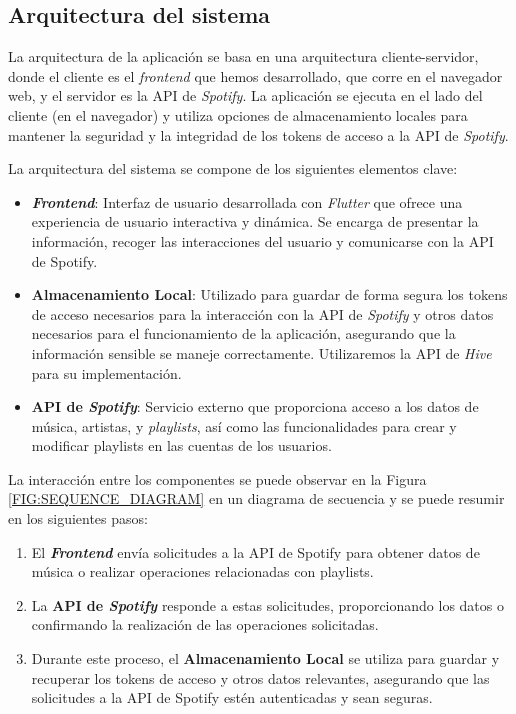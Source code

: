 \subsection{Arquitectura del sistema\label{SEC:DISENO_ARQUITECTURA}}

La arquitectura de la aplicación se basa en una arquitectura cliente-servidor, donde el cliente es el \textit{frontend} que hemos desarrollado, que corre en el navegador web, y 
el servidor es la API de \textit{Spotify}. La aplicación se ejecuta en el lado del cliente (en el navegador) y utiliza opciones de almacenamiento locales para mantener la seguridad y 
la integridad de los tokens de acceso a la API de \textit{Spotify}. 

La arquitectura del sistema se compone de los siguientes elementos clave:

\begin{itemize}
    \item \textbf{\textit{Frontend}}: Interfaz de usuario desarrollada con \textit{Flutter} que ofrece una experiencia de usuario interactiva 
    y dinámica. Se encarga de presentar la información, recoger las interacciones del usuario y comunicarse con la API de Spotify.
    \item \textbf{Almacenamiento Local}: Utilizado para guardar de forma segura los tokens de acceso necesarios para la interacción con la API de \textit{Spotify}
    y otros datos necesarios para el funcionamiento de la aplicación, asegurando que la información sensible se maneje correctamente. Utilizaremos
    la API de \textit{Hive} \cite{hive} para su implementación.
    \item \textbf{API de \textit{Spotify}}: Servicio externo que proporciona acceso a los datos de música, artistas, y \textit{playlists}, así como las funcionalidades 
    para crear y modificar playlists en las cuentas de los usuarios.
\end{itemize}

La interacción entre los componentes se puede observar en la Figura \ref{FIG:SEQUENCE_DIAGRAM} en un diagrama de secuencia
y se puede resumir en los siguientes pasos:

\begin{enumerate}
    \item El \textbf{\textit{Frontend}} envía solicitudes a la API de Spotify para obtener datos de música o realizar operaciones relacionadas con playlists.
    \item La \textbf{API de \textit{Spotify}} responde a estas solicitudes, proporcionando los datos o confirmando la realización de las operaciones solicitadas.
    \item Durante este proceso, el \textbf{Almacenamiento Local} se utiliza para guardar y recuperar los tokens de acceso y otros datos relevantes, asegurando 
    que las solicitudes a la API de Spotify estén autenticadas y sean seguras.
\end{enumerate}



